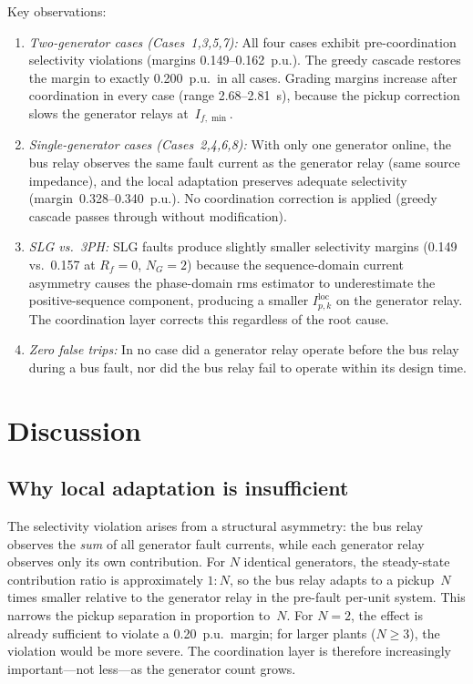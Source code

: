 \documentclass[journal,twoside,letterpaper]{IEEEtran}
\begin{document}
Key observations:
\begin{enumerate}
  \item \emph{Two-generator cases (Cases~1,3,5,7):}
    All four cases exhibit pre-coordination selectivity
    violations (margins 0.149--0.162~p.u.).
    The greedy cascade restores the margin to exactly
    0.200~p.u.\ in all cases.
    Grading margins increase after coordination in every
    case (range 2.68--2.81~s), because the pickup
    correction slows the generator relays at~$I_{f,\min}$.

  \item \emph{Single-generator cases (Cases~2,4,6,8):}
    With only one generator online, the bus relay observes
    the same fault current as the generator relay
    (same source impedance), and the local adaptation
    preserves adequate selectivity (margin~0.328--0.340~p.u.).
    No coordination correction is applied (greedy
    cascade passes through without modification).

  \item \emph{SLG vs.\ 3PH:}
    SLG faults produce slightly smaller selectivity
    margins (0.149 vs.\ 0.157 at $R_f{=}0$, $N_G{=}2$)
    because the sequence-domain current asymmetry causes
    the phase-domain rms estimator to underestimate the
    positive-sequence component, producing a smaller
    $I_{p,k}^{\mathrm{loc}}$ on the generator relay.
    The coordination layer corrects this regardless of
    the root cause.

  \item \emph{Zero false trips:}
    In no case did a generator relay operate before the
    bus relay during a bus fault, nor did the bus relay
    fail to operate within its design time.
\end{enumerate}

\section{Discussion}
\label{sec:discussion}

\subsection{Why local adaptation is insufficient}

The selectivity violation arises from a structural
asymmetry: the bus relay observes the \emph{sum} of all
generator fault currents, while each generator relay
observes only its own contribution.
For $N$ identical generators, the steady-state
contribution ratio is approximately $1:N$, so the bus
relay adapts to a pickup~$N$ times smaller relative to
the generator relay in the pre-fault per-unit system.
This narrows the pickup separation in proportion to~$N$.
For $N=2$, the effect is already sufficient to violate
a 0.20~p.u.\ margin; for larger plants ($N \geq 3$),
the violation would be more severe.
The coordination layer is therefore increasingly
important---not less---as the generator count grows.
\end{document}
